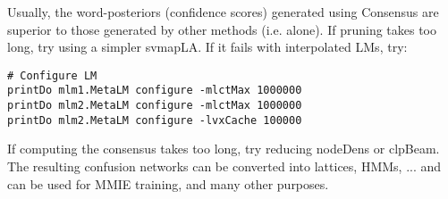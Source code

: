 Usually,  the  word-posteriors  (confidence scores)  generated  using
Consensus are superior     to   those generated by    other    methods
(i.e.  alone).  If pruning takes too long,  try
using a simpler svmapLA. If it fails with interpolated LMs, try:

\begin{verbatim}
# Configure LM
printDo mlm1.MetaLM configure -mlctMax 1000000
printDo mlm2.MetaLM configure -mlctMax 1000000
printDo mlm2.MetaLM configure -lvxCache 100000
\end{verbatim}

If computing the consensus takes too long, try reducing nodeDens or
clpBeam. The resulting confusion networks can be converted into
lattices, HMMs, ... and can be used for MMIE training, and many other
purposes.

